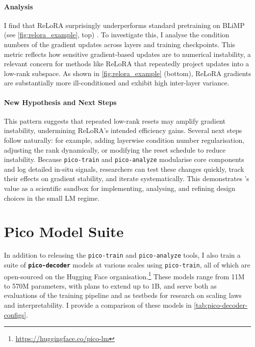 \paragraph{Analysis} I find that ReLoRA surprisingly underperforms standard pretraining on BLiMP (see \cref{fig:relora_example}, top) \citep{warstadt2020blimp}. To investigate this, I analyse the condition numbers of the gradient updates across layers and training checkpoints. This metric reflects how sensitive gradient-based updates are to numerical instability, a relevant concern for methods like ReLoRA that repeatedly project updates into a low-rank subspace. As shown in \cref{fig:relora_example} (bottom), ReLoRA gradients are substantially more ill-conditioned and exhibit high inter-layer variance. 


\paragraph{New Hypothesis and Next Steps}
This pattern suggests that repeated low-rank resets may amplify gradient instability, undermining ReLoRA's intended efficiency gains. Several next steps follow naturally: for example, adding layerwise condition number regularisation, adjusting the rank dynamically, or modifying the reset schedule to reduce instability. Because \texttt{pico-train} and \texttt{pico-analyze} modularise core components and log detailed in-situ signals, researchers can test these changes quickly, track their effects on gradient stability, and iterate systematically. This demonstrates \pico's value as a scientific sandbox for implementing, analysing, and refining design choices in the small LM regime.

\section{Pico Model Suite}
\label{sec:pico-model-suite}

In addition to releasing the \texttt{pico-train} and \texttt{pico-analyze} tools, I also train a suite of \textbf{\texttt{pico-decoder}} models at various scales using \texttt{pico-train}, all of which are open-sourced on the Hugging Face organisation.\footnote{\url{https://huggingface.co/pico-lm}} These models range from 11M to 570M parameters, with plans to extend up to 1B, and serve both as evaluations of the training pipeline and as testbeds for research on scaling laws and interpretability. I provide a comparison of these models in \cref{tab:pico-decoder-configs}.

